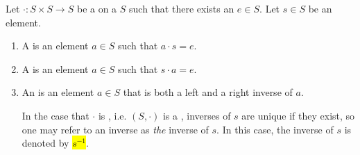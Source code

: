 \begin{definition} \label{definition:left_right_inverse_of_an_element_for_a_binary_operation_on_a_set}
    Let $\cdot: S \times S \to S$ be a  on a  $S$ such that there exists an  $e \in S$. Let $s \in S$ be an element. 
    \begin{enumerate}
        \item A  is an element $a \in S$ such that $a \cdot s = e$.
        \item A  is an element $a \in S$ such that $s \cdot a = e$.
        \item An  is an element $a \in S$ that is both a left and a right inverse of $a$. 

        In the case that $\cdot$ is , i.e. $(S,\cdot)$ is a , inverses of $s$ are unique if they exist, so one may refer to an inverse as \emph{the} inverse of $s$. In this case, the inverse of $s$ is denoted by \hl{$s^{-1}$}.
    \end{enumerate}
\end{definition}